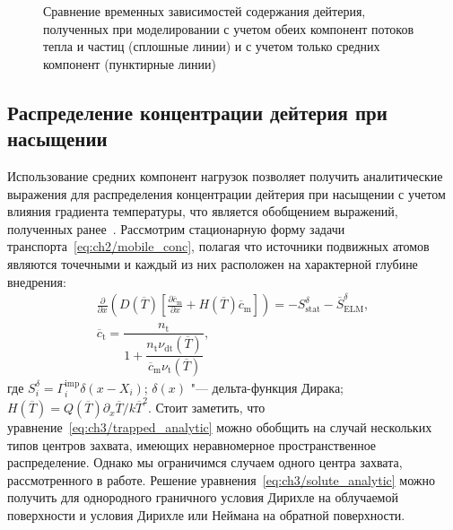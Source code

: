 \begin{figure}[ht]
	\caption{Сравнение временных зависимостей содержания дейтерия, полученных при моделировании с учетом обеих компонент потоков тепла и частиц (сплошные линии) и с учетом только средних компонент (пунктирные линии)}\label{fig:ch3/Eqv_load}
\end{figure}

\subsection{Распределение концентрации дейтерия при насыщении}\label{sec:ch3/sec3/subsec2}
Использование средних компонент нагрузок позволяет получить аналитические выражения для распределения концентрации дейтерия при насыщении с учетом влияния градиента температуры, что является обобщением выражений, полученных ранее~\cite{Denis2022}. Рассмотрим стационарную форму задачи транспорта~\cref{eq:ch2/mobile_conc}, полагая что источники подвижных атомов являются точечными и каждый из них расположен на характерной глубине внедрения:
\begin{subequations}
	\label{eq:ch3/eq:solute_analytic}
	\begin{gather}
	\frac{\partial}{\partial x}\left(D(\overline{T})\left[\frac{\partial \overline{c}_{\mathrm{m}}}{\partial x} +H(\overline{T})\overline{c}_{\mathrm{m}}\right] \right)= - S_{\mathrm{stat}}^{\delta}-\overline{S}_{\mathrm{ELM}}^{\delta}, \label{eq:ch3/solute_analytic}\\
	\overline{c}_{\mathrm{t}}=\dfrac{n_{\mathrm{t}}}{1+\dfrac{n_{\mathrm{t}}\nu_{\mathrm{dt}}(\overline{T})}{\overline{c}_{\mathrm{m}}\nu_{\mathrm{t}}(\overline{T})}},\label{eq:ch3/trapped_analytic}
	\end{gather}
\end{subequations}
где $S_i^\delta=\Gamma_i^{\mathrm{imp}}\delta(x-X_i)$; $\delta(x)$ "--- дельта-функция Дирака; $H(\overline{T})=Q(\overline{T})\partial_x \overline{T}/k\overline{T}^2$. Стоит заметить, что уравнение~\cref{eq:ch3/trapped_analytic} можно обобщить на случай нескольких типов центров захвата, имеющих неравномерное пространственное распределение. Однако мы ограничимся случаем одного центра захвата, рассмотренного в работе. Решение уравнения~\cref{eq:ch3/solute_analytic} можно получить для однородного граничного условия Дирихле на облучаемой поверхности и условия Дирихле или Неймана на обратной поверхности.

